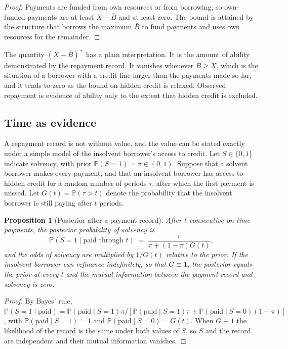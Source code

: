 \documentclass[11pt]{article}
\newtheorem{proposition}[theorem]{Proposition}
\theoremstyle{definition}
\theoremstyle{remark}
\newcommand{\Prob}{\mathbb{P}}
\begin{document}
\begin{proof}
Payments are funded from own resources or from borrowing, so own-funded payments are at least $X-\bar B$ and at least zero. The bound is attained by the structure that borrows the maximum $\bar B$ to fund payments and uses own resources for the remainder.
\end{proof}

The quantity $(X-\bar B)^+$ has a plain interpretation. It is the amount of ability demonstrated by the repayment record. It vanishes whenever $\bar B\ge X$, which is the situation of a borrower with a credit line larger than the payments made so far, and it tends to zero as the bound on hidden credit is relaxed. Observed repayment is evidence of ability only to the extent that hidden credit is excluded.

\subsection{Time as evidence}

A repayment record is not without value, and the value can be stated exactly under a simple model of the insolvent borrower's access to credit. Let $S\in\{0,1\}$ indicate solvency, with prior $\Prob(S=1)=\pi\in(0,1)$. Suppose that a solvent borrower makes every payment, and that an insolvent borrower has access to hidden credit for a random number of periods $\tau$, after which the first payment is missed. Let $G(t)=\Prob(\tau>t)$ denote the probability that the insolvent borrower is still paying after $t$ periods.

\begin{proposition}[Posterior after a payment record]\label{prop:time}
After $t$ consecutive on-time payments, the posterior probability of solvency is
\[
\Prob(S=1\mid \text{paid through } t)\;=\;\frac{\pi}{\pi+(1-\pi)G(t)},
\]
and the odds of solvency are multiplied by $1/G(t)$ relative to the prior. If the insolvent borrower can refinance indefinitely, so that $G\equiv 1$, the posterior equals the prior at every $t$ and the mutual information between the payment record and solvency is zero.
\end{proposition}

\begin{proof}
By Bayes' rule, $\Prob(S=1\mid\text{paid})=\Prob(\text{paid}\mid S=1)\pi/[\Prob(\text{paid}\mid S=1)\pi+\Prob(\text{paid}\mid S=0)(1-\pi)]$, with $\Prob(\text{paid}\mid S=1)=1$ and $\Prob(\text{paid}\mid S=0)=G(t)$. When $G\equiv 1$ the likelihood of the record is the same under both values of $S$, so $S$ and the record are independent and their mutual information vanishes.
\end{proof}
\end{document}
